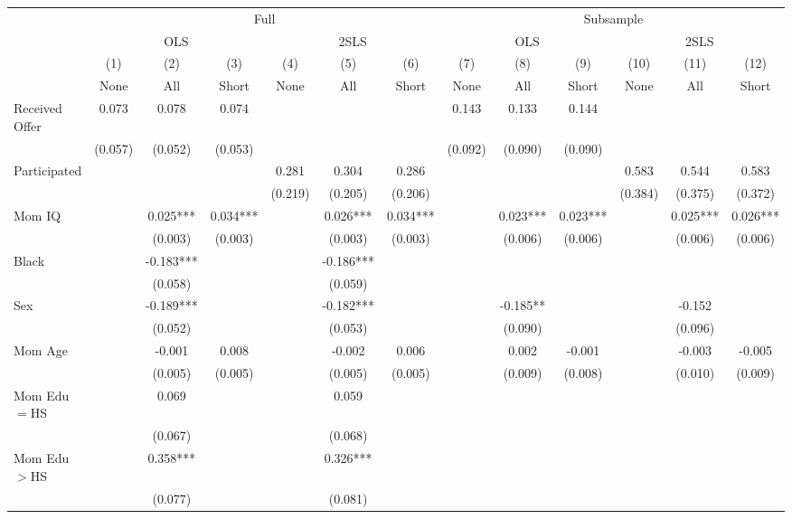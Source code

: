 \begin{tabular}{lcccccccccccc}
\toprule 
\midrule 
 & \multicolumn{6}{c}{Full} & \multicolumn{6}{c}{Subsample} \\
 \cmidrule(lr){2-7} \cmidrule(lr){8-13} 
 & \multicolumn{3}{c}{OLS} & \multicolumn{3}{c}{2SLS} & \multicolumn{3}{c}{OLS} & \multicolumn{3}{c}{2SLS} \\
 \cmidrule(lr){2-4} \cmidrule(lr){5-7} \cmidrule(lr){8-10} \cmidrule(lr){11-13} 
 & (1) & (2) & (3) & (4) & (5) & (6) & (7) & (8) & (9) & (10) & (11) & (12) \\
 & None & All & Short & None & All & Short & None & All & Short & None & All & Short \\
\midrule 
Received Offer & 0.073 & 0.078 & 0.074 &  &  &  & 0.143 & 0.133 & 0.144 &  &  &  \\
 & (0.057) & (0.052) & (0.053) &  &  &  & (0.092) & (0.090) & (0.090) &  &  &  \\
Participated &  &  &  & 0.281 & 0.304 & 0.286 &  &  &  & 0.583 & 0.544 & 0.583 \\
 &  &  &  & (0.219) & (0.205) & (0.206) &  &  &  & (0.384) & (0.375) & (0.372) \\
Mom IQ &  & 0.025*** & 0.034*** &  & 0.026*** & 0.034*** &  & 0.023*** & 0.023*** &  & 0.025*** & 0.026*** \\
 &  & (0.003) & (0.003) &  & (0.003) & (0.003) &  & (0.006) & (0.006) &  & (0.006) & (0.006) \\
Black &  & -0.183*** &  &  & -0.186*** &  &  &  &  &  &  &  \\
 &  & (0.058) &  &  & (0.059) &  &  &  &  &  &  &  \\
Sex &  & -0.189*** &  &  & -0.182*** &  &  & -0.185** &  &  & -0.152 &  \\
 &  & (0.052) &  &  & (0.053) &  &  & (0.090) &  &  & (0.096) &  \\
Mom Age &  & -0.001 & 0.008 &  & -0.002 & 0.006 &  & 0.002 & -0.001 &  & -0.003 & -0.005 \\
 &  & (0.005) & (0.005) &  & (0.005) & (0.005) &  & (0.009) & (0.008) &  & (0.010) & (0.009) \\
Mom Edu$=$HS &  & 0.069 &  &  & 0.059 &  &  &  &  &  &  &  \\
 &  & (0.067) &  &  & (0.068) &  &  &  &  &  &  &  \\
Mom Edu$>$HS &  & 0.358*** &  &  & 0.326*** &  &  &  &  &  &  &  \\
 &  & (0.077) &  &  & (0.081) &  &  &  &  &  &  &  \\

\end{tabular}
